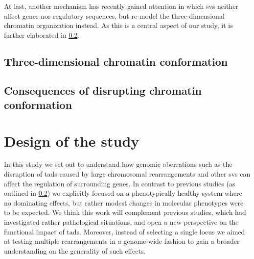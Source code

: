 At last, another mechanism has recently gained attention in which \acp{sv}
neither affect genes nor regulatory sequences, but re-model the
three-dimensional chromatin organization instead. As this is a central aspect of
our study, it is further elaborated in \cref{sec:disrupting_tads}.




\subsection{Three-dimensional chromatin conformation}
\label{sec:chromatin_conformation}







\subsection{Consequences of disrupting chromatin conformation}
\label{sec:disrupting_tads}






\section{Design of the study}
\label{sec:balancer_study_design}

In this study we set out to understand how genomic aberrations such as the
disruption of \acp{tad} caused by large chromosomal rearrangements and other
\acp{sv} can affect the regulation of surrounding genes. In contrast to previous
studies (as outlined in \cref{sec:disrupting_tads}) we explicitly
focused on a phenotypically healthy system where no dominating effects, but
rather modest changes in molecular phenotypes were to be expected. We think this
work will complement previous studies, which had investigated rather
pathological situations, and open a new perspective on the functional impact of
\acp{tad}. Moreover, instead of selecting a single locus we aimed at testing
multiple rearrangements in a genome-wide fashion to gain a broader understanding
on the generality of such effects.




